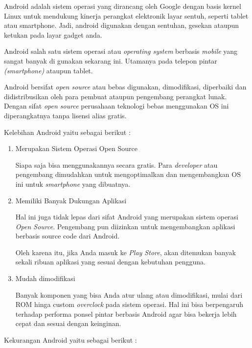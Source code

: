     
    \par Android adalah sistem operasi yang dirancang oleh Google dengan basis kernel Linux untuk mendukung kinerja perangkat elektronik layar sentuh, seperti tablet atau smartphone. Jadi, android digunakan dengan sentuhan, gesekan ataupun ketukan pada layar gadget anda.\\
    \par Android  salah satu sistem operasi atau \textit{operating system} berbasis \textit{mobile} yang sangat banyak di gunakan sekarang ini. Utamanya pada telepon pintar \textit{(smartphone)} ataupun tablet.\\
    \par Android bersifat \textit{open source} atau bebas digunakan, dimodifikasi, diperbaiki dan didistribusikan oleh para pembuat ataupun pengembang perangkat lunak. Dengan sifat \textit{open source} perusahaan teknologi bebas menggunakan OS ini diperangkatnya tanpa lisensi alias gratis.
    \par Kelebihan Android yaitu sebagai berikut :
    \begin{enumerate}
        \item Merupakan Sistem Operasi Open Source
\par Siapa saja bisa menggunakannya secara gratis. Para \textit{developer} atau pengembang dimudahkan untuk mengoptimalkan dan mengembangkan OS ini untuk \textit{smartphone} yang dibuatnya.

\item Memiliki Banyak Dukungan Aplikasi
\par Hal ini juga tidak lepas dari sifat Android yang merupakan sistem operasi \textit{Open Source}. Pengembang pun diizinkan untuk mengembangkan aplikasi berbasis source code dari Android.

\par Oleh karena itu, jika Anda masuk ke \textit{Play Store}, akan ditemukan banyak sekali ribuan aplikasi yang sesuai dengan kebutuhan pengguna.

\item Mudah dimodifikasi
\par Banyak komponen yang bisa Anda atur ulang atau dimodifikasi, mulai dari ROM  hinga custom \textit{overclock} pada sistem operasi. Hal ini bisa berpengaruh terhadap performa ponsel pintar berbasis Android agar bisa bekerja lebih cepat dan sesuai dengan keinginan.
\end{enumerate}
\par Kekurangan Android yaitu sebagai berikut :
